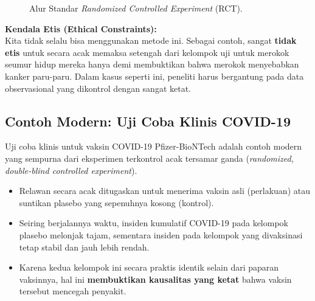 \documentclass[12pt,a4paper]{article}
\begin{document}
\begin{figure}[h]
    \centering
    \caption{Alur Standar \textit{Randomized Controlled Experiment} (RCT).}
\end{figure}

\textbf{Kendala Etis (Ethical Constraints):}\\
Kita tidak selalu bisa menggunakan metode ini. Sebagai contoh, sangat \textbf{tidak etis} untuk secara acak memaksa setengah dari kelompok uji untuk merokok seumur hidup mereka hanya demi membuktikan bahwa merokok menyebabkan kanker paru-paru. Dalam kasus seperti ini, peneliti harus bergantung pada data observasional yang dikontrol dengan sangat ketat.

\subsection{Contoh Modern: Uji Coba Klinis COVID-19}
Uji coba klinis untuk vaksin COVID-19 Pfizer-BioNTech adalah contoh modern yang sempurna dari eksperimen terkontrol acak tersamar ganda (\textit{randomized, double-blind controlled experiment}).
\begin{itemize}
    \item Relawan secara acak ditugaskan untuk menerima vaksin asli (perlakuan) atau suntikan plasebo yang sepenuhnya kosong (kontrol).
    \item Seiring berjalannya waktu, insiden kumulatif COVID-19 pada kelompok plasebo melonjak tajam, sementara insiden pada kelompok yang divaksinasi tetap stabil dan jauh lebih rendah. 
    \item Karena kedua kelompok ini secara praktis identik selain dari paparan vaksinnya, hal ini \textbf{membuktikan kausalitas yang ketat} bahwa vaksin tersebut mencegah penyakit.
\end{itemize}
\end{document}
